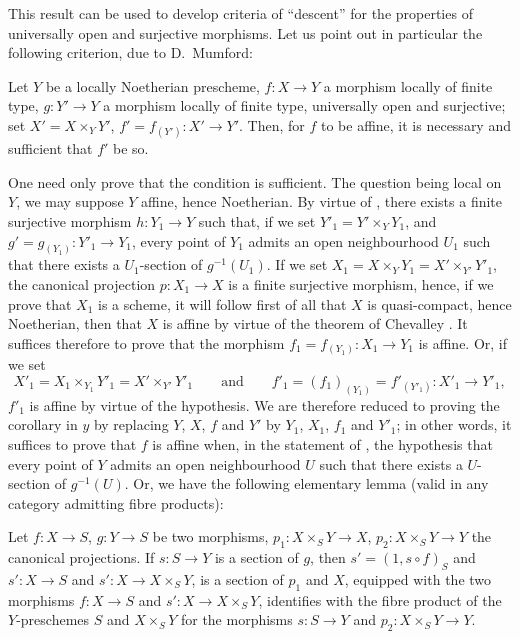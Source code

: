 This result can be used to develop criteria of ``descent'' for the properties of universally open and surjective morphisms.
Let us point out in particular the following criterion, due to D.\ Mumford:

\begin{corollary}[14.5.11]
\label{IV.14.5.11}
Let $Y$ be a locally Noetherian prescheme, $f:X\to Y$ a morphism locally of finite type, $g:Y'\to Y$ a morphism locally of finite type, universally open and surjective; set $X'=X\times_Y Y'$, $f'=f_{(Y')}:X'\to Y'$.
Then, for $f$ to be affine, it is necessary and sufficient that $f'$ be so.
\end{corollary}

One need only prove that the condition is sufficient.
The question being local on $Y$, we may suppose $Y$ affine, hence Noetherian.
By virtue of , there exists a finite surjective morphism $h:Y_1\to Y$ such that, if we set $Y'_1=Y'\times_Y Y_1$, and $g'=g_{(Y_1)}:Y'_1\to Y_1$, every point of $Y_1$ admits an open neighbourhood $U_1$ such that there exists a $U_1$-section of $g^{-1}(U_1)$.
If we set $X_1=X\times_Y Y_1=X'\times_{Y'}Y'_1$, the canonical projection $p:X_1\to X$ is a finite surjective morphism, hence, if we prove that $X_1$ is a scheme, it will follow first of all that $X$ is quasi-compact, hence Noetherian, then that $X$ is affine by virtue of the theorem of Chevalley .
It suffices therefore to prove that the morphism $f_1=f_{(Y_1)}:X_1\to Y_1$ is affine.
Or, if we set
\[
  X'_1=X_1\times_{Y_1}Y'_1=X'\times_{Y'}Y'_1 \qquad\text{and}\qquad f'_1=(f_1)_{(Y_1)}=f'_{(Y'_1)}:X'_1\to Y'_1,
\]
$f'_1$ is affine by virtue of the hypothesis.
We are therefore reduced to proving the corollary in $y$ by replacing $Y$, $X$, $f$ and $Y'$ by $Y_1$, $X_1$, $f_1$ and $Y'_1$; in other words, it suffices to prove that $f$ is affine when, in the statement of , the hypothesis that every point of $Y$ admits an open neighbourhood $U$ such that there exists a $U$-section of $g^{-1}(U)$.
Or, we have the following elementary lemma (valid in any category admitting fibre products):

\begin{lemma}[14.5.11.1]
\label{IV.14.5.11.1}
Let $f:X\to S$, $g:Y\to S$ be two morphisms, $p_1:X\times_S Y\to X$, $p_2:X\times_S Y\to Y$ the canonical projections.
If $s:S\to Y$ is a section of $g$, then $s'=(1,s\circ f)_S$ and $s':X\to S$ and $s':X\to X\times_S Y$, is a section of $p_1$ and $X$, equipped with the two morphisms $f:X\to S$ and $s':X\to X\times_S Y$, identifies with the fibre product of the $Y$-preschemes $S$ and $X\times_S Y$ for the morphisms $s:S\to Y$ and $p_2:X\times_S Y\to Y$.
\end{lemma}

